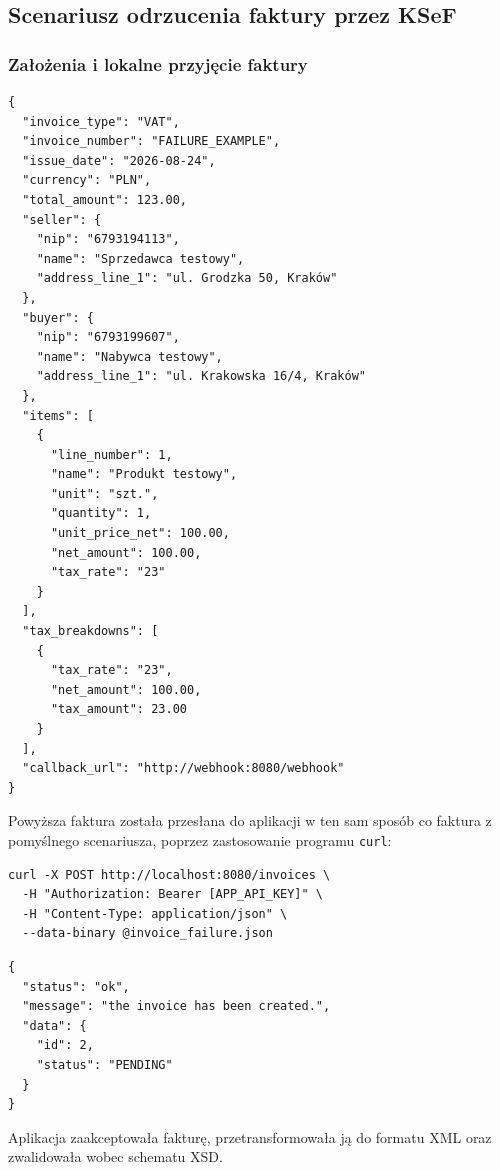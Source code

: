 \subsection{Scenariusz odrzucenia faktury przez KSeF}

\subsubsection{Założenia i lokalne przyjęcie faktury}

\begin{lstlisting}[style=thesiscode, caption={Dane faktury zawierającej nieuprawniony NIP sprzedawcy}, label={lst:failure-invoice-data}]
{
  "invoice_type": "VAT",
  "invoice_number": "FAILURE_EXAMPLE",
  "issue_date": "2026-08-24",
  "currency": "PLN",
  "total_amount": 123.00,
  "seller": {
    "nip": "6793194113",
    "name": "Sprzedawca testowy",
    "address_line_1": "ul. Grodzka 50, Kraków"
  },
  "buyer": {
    "nip": "6793199607",
    "name": "Nabywca testowy",
    "address_line_1": "ul. Krakowska 16/4, Kraków"
  },
  "items": [
    {
      "line_number": 1,
      "name": "Produkt testowy",
      "unit": "szt.",
      "quantity": 1,
      "unit_price_net": 100.00,
      "net_amount": 100.00,
      "tax_rate": "23"
    }
  ],
  "tax_breakdowns": [
    {
      "tax_rate": "23",
      "net_amount": 100.00,
      "tax_amount": 23.00
    }
  ],
  "callback_url": "http://webhook:8080/webhook"
}
\end{lstlisting}

Powyższa faktura została przesłana do aplikacji w ten sam sposób co faktura z pomyślnego scenariusza, poprzez zastosowanie programu \texttt{curl}:

\begin{lstlisting}[style=thesiscode, caption={Przekazanie faktury z nieuprawnionym NIP sprzedawcy do aplikacji}, label={lst:failure-submit-invoice}]
curl -X POST http://localhost:8080/invoices \
  -H "Authorization: Bearer [APP_API_KEY]" \
  -H "Content-Type: application/json" \
  --data-binary @invoice_failure.json
\end{lstlisting}

\begin{lstlisting}[style=thesiscode, caption={Odpowiedź aplikacji po przyjęciu faktury}, label={lst:failure-create-response}]
{
  "status": "ok",
  "message": "the invoice has been created.",
  "data": {
    "id": 2,
    "status": "PENDING"
  }
}
\end{lstlisting}

Aplikacja zaakceptowała fakturę, przetransformowała ją do formatu XML oraz zwalidowała wobec schematu XSD.

